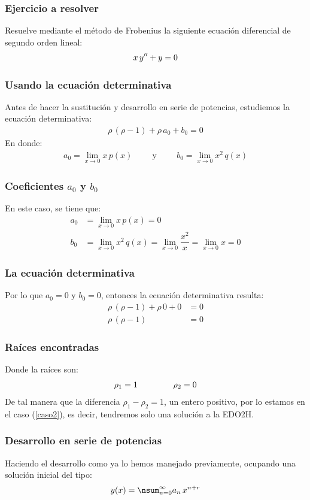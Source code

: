 \documentclass[12pt]{beamer}
\begin{document}
\begin{frame}
\frametitle{Ejercicio a resolver}
Resuelve mediante el método de Frobenius la siguiente ecuación diferencial de segundo orden lineal:
\begin{align*}
x \, {y}^{\prime \prime} + y = 0
\end{align*}
\end{frame}
\begin{frame}
\frametitle{Usando la ecuación determinativa}
Antes de hacer la sustitución y desarrollo en serie de potencias, estudiemos la ecuación determinativa:
\pause
\begin{align*}
\rho \, (\rho - 1) + \rho \, a_{0} + b_{0} = 0
\end{align*}
\pause
En donde:
\begin{align*}
a_{0} = \lim_{x \to 0} x \, p(x) \hspace{1cm} \mbox{y} \hspace{1cm} b_{0} = \lim_{x \to 0} x^{2} \, q(x)
\end{align*}
\end{frame}
\begin{frame}
\frametitle{Coeficientes $a_{0}$ y $b_{0}$}
En este caso, se tiene que:
\begin{align*}
a_{0} &= \lim_{x \to 0} x \, p(x) = 0 \\[1em]
b_{0} &= \lim_{x \to 0} x^{2} \, q(x) = \lim_{x \to 0} \dfrac{x^{2}}{x} = \lim_{x \to 0} x = 0
\end{align*}
\end{frame}
\begin{frame}
\frametitle{La ecuación determinativa}
Por lo que $a_{0} = 0$ y $b_{0} = 0$, entonces la ecuación determinativa resulta:
\pause
\begin{align*}
\rho \, (\rho - 1) + \rho \, 0 + 0 &= 0 \\[1em]
\rho \, (\rho - 1) &= 0 
\end{align*}
\end{frame}
\begin{frame}
\frametitle{Raíces encontradas}
Donde la raíces son:
\pause
\begin{align*}
\rho_{1} = 1 \hspace{1.5cm} \rho_{2} = 0
\end{align*}
\pause
De tal manera que la diferencia $\rho_{1} - \rho_{2} = 1$, un entero positivo, por lo estamos en el caso (\ref{caso2}), es decir, tendremos solo una solución a la EDO2H.
\end{frame}
\begin{frame}
\frametitle{Desarrollo en serie de potencias}
Haciendo el desarrollo como ya lo hemos manejado previamente, ocupando una solución inicial del tipo:
\pause
\begin{align*}
y(x) = \nsum_{n=0}^{\infty} a_{n} \, x^{n+r}
\end{align*}
\end{frame}
\end{document}
